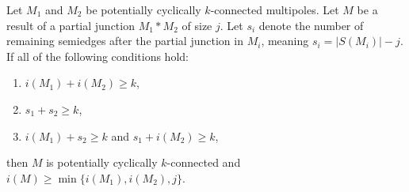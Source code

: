 \documentclass[12pt, twoside]{book}
\begin{document}
\begin{theorem}\label{th:connecting-potentially-cyclically-connected-with-number-of-resulting-semiedges}
	Let $M_1$ and $M_2$ be potentially cyclically $k$-connected multipoles. Let $M$ be a result of a partial junction $M_1*M_2$ of size $j$. Let $s_i$ denote the number of remaining semiedges after the partial junction in $M_i$, meaning ${s_i=|S(M_i)|-j}$. If all of the following conditions hold:
	\begin{enumerate}[label=(\roman*)]
		\item $i(M_1)+i(M_2)\geq k$,\label{item:test}
		\item $s_1+s_2\geq k$,
		\item $i(M_1)+s_2\geq k$ and $s_1+i(M_2)\geq k$,
	\end{enumerate}
	then $M$ is potentially cyclically $k$-connected and $i(M)\geq \min\{i(M_1), i(M_2), j\}$.
\end{theorem}
\end{document}
